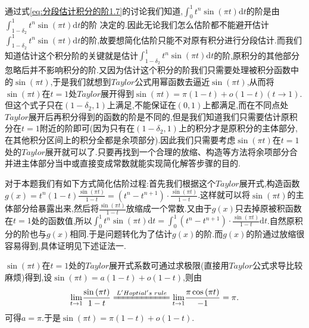 \documentclass[lang=cn,newtx,10pt,scheme=chinese]{../Template/elegantbook}
\begin{document}
\begin{note}
通过式\ref{eq:分段估计积分的阶1.7}的讨论我们知道,$\int_0^1{t^n\sin \left( \pi t \right) \mathrm{d}t}$的阶是由$\int_{1-\delta_2}^1{t^n\sin \left( \pi t \right) \mathrm{d}t}$的阶
决定的.因此无论我们怎么估阶都不能避开估计$\int_{1-\delta_2}^1{t^n\sin \left( \pi t \right) \mathrm{d}t}$的阶,故要想简化估阶只能不对原有积分进行分段估计.而我们知道估计这个积分阶的关键就是估计$\int_{1-\delta_2}^1{t^n\sin \left( \pi t \right) \mathrm{d}t}$的阶,原积分的其他部分忽略后并不影响积分的阶.又因为估计这个积分的阶我们只需要处理被积分函数中的$\sin(\pi t)$,于是我们就想到$Taylor$公式用幂函数去逼近$\sin(\pi t)$,从而将$\sin(\pi t)$在$t=1$处$Taylor$展开得到$\sin \left( \pi t \right) =\pi\left( 1-t \right) +o\left( 1-t \right)$$(t\to 1)$.但这个式子只在$(1-\delta_2,1)$上满足,不能保证在$(0,1)$上都满足,而在不同点处$Taylor$展开后再积分得到的函数的阶是不同的,但是我们知道我们只需要估计原积分在$t=1$附近的阶即可(因为只有在$(1-\delta_2,1)$上的积分才是原积分的主体部分,在其他积分区间上的积分全都是余项部分).因此我们只需要考虑$\sin(\pi t)$在$t=1$处的$Taylor$展开就可以了.只要再找到一个合理的放缩、构造等方法将余项部分合并进主体部分当中或直接变成常数就能实现简化解答步骤的目的.

对于本题我们有如下方式简化估阶过程:首先我们根据这个$Taylor$展开式,构造函数$g\left( x \right) =t^n\left( 1-t \right) \frac{\sin \left( \pi t \right)}{1-t}=\left( t^n-t^{n+1} \right) \cdot \frac{\sin \left( \pi t \right)}{1-t}$.这样就可以将$\sin(\pi t)$的主体部分给暴露出来,然后将$\frac{\sin(\pi t)}{1-t}$放缩成一个常数.又由于$g(x)$只去掉原被积函数在$t=1$处的函数值,所以$\int_0^1{t^n\sin \left( \pi t \right) \mathrm{d}t}=\int_0^1{\left( t^n-t^{n+1} \right) \cdot \frac{\sin \left( \pi t \right)}{1-t}\mathrm{d}t}$.自然原积分的阶也与$g(x)$相同.于是问题转化为了估计$g(x)$的阶.而$g(x)$的阶通过放缩很容易得到,具体证明见下述证法一.
\end{note}
\begin{remark}
$\sin(\pi t)$在$t=1$处的$Taylor$展开式系数可通过求极限(直接用$Taylor$公式求导比较麻烦)得到,设$\sin \left( \pi t \right) =a\left( 1-t \right) +o\left( 1-t \right)$,则由
\begin{align*}
\underset{t\rightarrow 1}{\lim}\frac{\sin \left( \pi t \right)}{1-t}\xlongequal[]{L'Hoptial's\,\,rule}\underset{t\rightarrow 1}{\lim}\frac{\pi \cos \left( \pi t \right)}{-1}=\pi.
\end{align*} 
可得$a=\pi$.于是$\sin \left( \pi t \right) =\pi\left( 1-t \right) +o\left( 1-t \right)$.
\end{remark}
\end{document}
